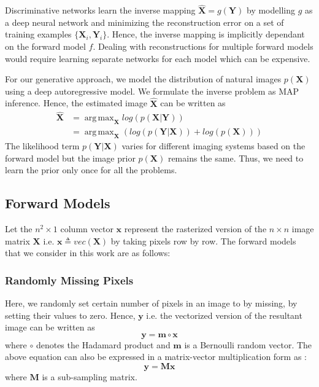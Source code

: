 \documentclass[journal,twoside]{IEEEtran}
\DeclareMathOperator*{\argmax}{arg\,max}
\newcommand{\X}{\mathbf{X}}
\newcommand{\Y}{\mathbf{Y}}
\newcommand{\x}{\mathbf{x}}
\newcommand{\y}{\mathbf{y}}
\begin{document}
Discriminative networks learn the inverse mapping $\hat{\X} = g(\Y)$ by modelling $g$ as a deep neural network and minimizing the reconstruction error on a set of training examples $\{\X_i,\Y_i\}$. Hence, the inverse mapping is implicitly dependant on the forward model $f$. Dealing with reconstructions for multiple forward models would require learning separate networks for each model which can be expensive. 

For our generative approach, we model the distribution of natural images $p(\X)$ using a deep autoregressive model.  
We formulate the inverse problem as MAP inference. Hence, the estimated image $\mathbf{\hat{X}}$ can be written as 
\begin{align}
\mathbf{\hat{X}} &= \argmax_{\X} log(p(\X|\Y))\\
&= \argmax_{\X} ( log(p(\Y|\X)) + log(p(\X)))
\end{align}
The likelihood term $p(\Y|\X)$ varies for different imaging systems based on the forward model but the image prior $p(\mathbf{\X})$ remains the same. Thus, we need to learn the prior only once for all the problems.

\subsection{Forward Models}
Let the $n^2 \times 1$ column vector $\mathbf{x}$ represent the rasterized version of the $n \times n$ image matrix $\X$ i.e. $\mathbf{x} \triangleq vec(\X)$ by taking pixels row by row. The forward models that we consider in this work are as follows:
\subsubsection{Randomly Missing Pixels}
Here, we randomly set certain number of pixels in an image to by missing, by setting their values to zero. Hence, $\y$ i.e. the vectorized version of the resultant image can be written as 
\begin{equation}
\y = \mathbf{m} \circ \x
\end{equation}
where $\circ$ denotes the Hadamard product and $\mathbf{m}$ is a Bernoulli random vector. The above equation can also be expressed in a matrix-vector multiplication form as :  
\begin{equation}
\y = \mathbf{M} \x
\end{equation}
where $\mathbf{M}$ is a sub-sampling matrix. 
\end{document}
